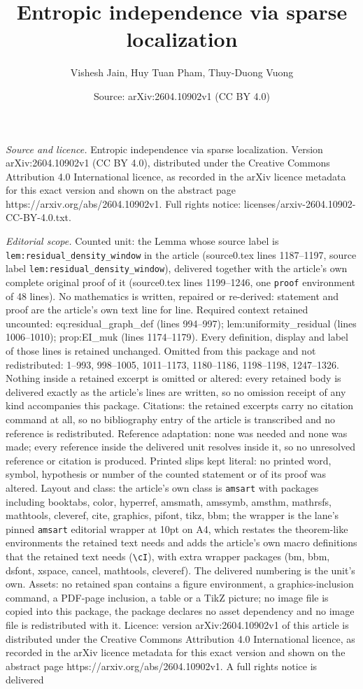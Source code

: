 \documentclass[10pt,a4paper]{amsart}
\title[Entropic independence via sparse localization]{Entropic independence via sparse localization}
\author{Vishesh Jain, Huy Tuan Pham, Thuy-Duong Vuong}
\date{Source: arXiv:2604.10902v1 (CC BY 4.0)}
\begin{document}
\maketitle

\noindent\emph{Source and licence.} Entropic independence via sparse localization. Version arXiv:2604.10902v1 (CC BY 4.0), distributed under the Creative Commons Attribution 4.0 International licence, as recorded in the arXiv licence metadata for this exact version and shown on the abstract page https://arxiv.org/abs/2604.10902v1. Full rights notice: licenses/arxiv-2604.10902-CC-BY-4.0.txt.\par\smallskip

\noindent\textit{Editorial scope.} Counted unit: the Lemma whose source label is \texttt{lem:residual\_density\_window} in the article (source0.tex lines 1187--1197, source label \texttt{lem:residual\_density\_window}), delivered together with the article's own complete original proof of it (source0.tex lines 1199--1246, one \texttt{proof} environment of 48 lines). No mathematics is written, repaired or re-derived: statement and proof are the article's own text line for line. Required context retained uncounted: eq:residual\_graph\_def (lines 994--997); lem:uniformity\_residual (lines 1006--1010); prop:EI\_muk (lines 1174--1179). Every definition, display and label of those lines is retained unchanged. Omitted from this package and not redistributed: 1--993, 998--1005, 1011--1173, 1180--1186, 1198--1198, 1247--1326. Nothing inside a retained excerpt is omitted or altered: every retained body is delivered exactly as the article's lines are written, so no omission receipt of any kind accompanies this package. Citations: the retained excerpts carry no citation command at all, so no bibliography entry of the article is transcribed and no reference is redistributed. Reference adaptation: none was needed and none was made; every reference inside the delivered unit resolves inside it, so no unresolved reference or citation is produced. Printed slips kept literal: no printed word, symbol, hypothesis or number of the counted statement or of its proof was altered. Layout and class: the article's own class is \texttt{amsart} with packages including booktabs, color, hyperref, amsmath, amssymb, amsthm, mathrsfs, mathtools, cleveref, cite, graphics, pifont, tikz, bbm; the wrapper is the lane's pinned \texttt{amsart} editorial wrapper at 10pt on A4, which restates the theorem-like environments the retained text needs and adds the article's own macro definitions that the retained text needs (\texttt{\textbackslash cI}), with extra wrapper packages (bm, bbm, dsfont, xspace, cancel, mathtools, cleveref). The delivered numbering is the unit's own. Assets: no retained span contains a figure environment, a graphics-inclusion command, a PDF-page inclusion, a table or a TikZ picture; no image file is copied into this package, the package declares no asset dependency and no image file is redistributed with it. Licence: version arXiv:2604.10902v1 of this article is distributed under the Creative Commons Attribution 4.0 International licence, as recorded in the arXiv licence metadata for this exact version and shown on the abstract page https://arxiv.org/abs/2604.10902v1. A full rights notice is delivered 
\end{document}
